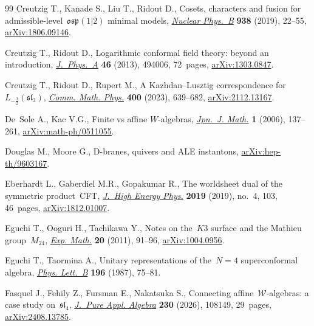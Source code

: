 \documentclass[pdftex]{sigma}
\numberwithin{equation}{section}
\begin{document}
\begin{thebibliography}{99}
Creutzig T., Kanade S., Liu T., Ridout D., Cosets, characters and fusion for
 admissible-level~{$\mathfrak{osp}(1|2)$} minimal models,
 \href{https://doi.org/10.1016/j.nuclphysb.2018.10.022}{\textit{Nuclear
 Phys.~B}} \textbf{938} (2019), 22--55,
 \href{http://arxiv.org/abs/1806.09146}{arXiv:1806.09146}.

Creutzig T., Ridout D., Logarithmic conformal field theory: beyond an
 introduction,
 \href{https://doi.org/10.1088/1751-8113/46/49/494006}{\textit{J.~Phys.~A}}
 \textbf{46} (2013), 494006, 72~pages,
 \href{http://arxiv.org/abs/1303.0847}{arXiv:1303.0847}.

Creutzig T., Ridout D., Rupert M., A {K}azhdan--{L}usztig correspondence
 for~{$L_{-\frac32}(\mathfrak{sl}_3)$},
 \href{https://doi.org/10.1007/s00220-022-04602-8}{\textit{Comm. Math. Phys.}}
 \textbf{400} (2023), 639--682,
 \href{http://arxiv.org/abs/2112.13167}{arXiv:2112.13167}.

De~Sole A., Kac V.G., Finite vs affine {$W$}-algebras,
 \href{https://doi.org/10.1007/s11537-006-0505-2}{\textit{Jpn.~J. Math.}}
 \textbf{1} (2006), 137--261,
 \href{http://arxiv.org/abs/math-ph/0511055}{arXiv:math-ph/0511055}.

Douglas M., Moore G., D-branes, quivers and {ALE} instantons,
 \href{http://arxiv.org/abs/hep-th/9603167}{arXiv:hep-th/9603167}.

Eberhardt L., Gaberdiel M.R., Gopakumar R., The worldsheet dual of the
 symmetric product~{CFT},
 \href{https://doi.org/10.1007/jhep04(2019)103}{\textit{J.~High Energy Phys.}}
 \textbf{2019} (2019), no.~4, 103, 46~pages,
 \href{http://arxiv.org/abs/1812.01007}{arXiv:1812.01007}.

Eguchi T., Ooguri H., Tachikawa Y., Notes on the~{$K3$} surface and the
 {M}athieu group~{$M_{24}$},
 \href{https://doi.org/10.1080/10586458.2011.544585}{\textit{Exp. Math.}}
 \textbf{20} (2011), 91--96,
 \href{http://arxiv.org/abs/1004.0956}{arXiv:1004.0956}.

Eguchi T., Taormina A., Unitary representations of the~{$N=4$} superconformal
 algebra, \href{https://doi.org/10.1016/0370-2693(87)91679-0}{\textit{Phys.
 Lett.~B}} \textbf{196} (1987), 75--81.

Fasquel J., Fehily Z., Fursman E., Nakatsuka S., Connecting
 affine~{$\mathcal{W}$}-algebras: a case study on~{$\mathfrak{sl}_{4}$},
 \href{https://doi.org/10.1016/j.jpaa.2025.108149}{\textit{J.~Pure Appl.
 Algebra}} \textbf{230} (2026), 108149, 29~pages,
 \href{http://arxiv.org/abs/2408.13785}{arXiv:2408.13785}.


\end{thebibliography}
\end{document}
